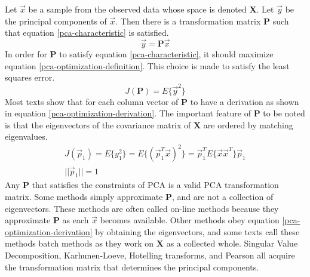 \documentclass[11pt]{article}
\begin{document}
Let $\vec{x}$ be a sample from the observed data whose space is denoted $\mathbf{X}$.  Let $\vec{y}$ be the principal components of $\vec{x}$.  Then there is a transformation matrix $\mathbf{P}$ such that equation \ref{pca-characteristic} is satisfied.
\begin{equation}
\vec{y} = \mathbf{P}\vec{x} \label{pca-characteristic}
\end{equation}
In order for $\mathbf{P}$ to satisfy equation \ref{pca-characteristic},  it should maximize equation \ref{pca-optimization-definition}.  This choice is made to satisfy the least squares error.  
\begin{equation}
J(\mathbf{P}) = E\{ \vec{y}^2 \}  \label{pca-optimization-definition}
\end{equation}
Most texts show that for each column vector of $\mathbf{P}$ to have a derivation as shown in equation \ref{pca-optimization-derivation}.  The important feature of $\mathbf{P}$ to be noted is that the eigenvectors of the covariance matrix of $\mathbf{X}$ are ordered by matching eigenvalues. 
\begin{eqnarray}
J(\vec{p}_1) = E \{ y^2 _1 \} = E \{ (\vec{p}_1^T \vec{x} )^2 \} = \vec{p}_1 ^T E \{ \vec{x}\vec{x}^T \} \vec{p}_1 \label{pca-optimization-derivation} \\
 || \vec{p}_1 || = 1 
\end{eqnarray}
Any $\mathbf{P}$ that satisfies the constraints of PCA is a valid PCA transformation matrix.  Some methods simply approximate $\mathbf{P}$, and are not a collection of eigenvectors.  These methods are often called on-line methods because they approximate $\mathbf{P}$ as each $\vec{x}$ becomes available. Other methods obey equation \ref{pca-optimization-derivation} by obtaining the eigenvectors, and some texts call these methods batch methods as they work on $\mathbf{X}$ as a collected whole. 
Singular Value Decomposition, Karhunen-Loeve,  Hotelling transforms, and Pearson all acquire the transformation matrix that determines the principal components.

\end{document}
